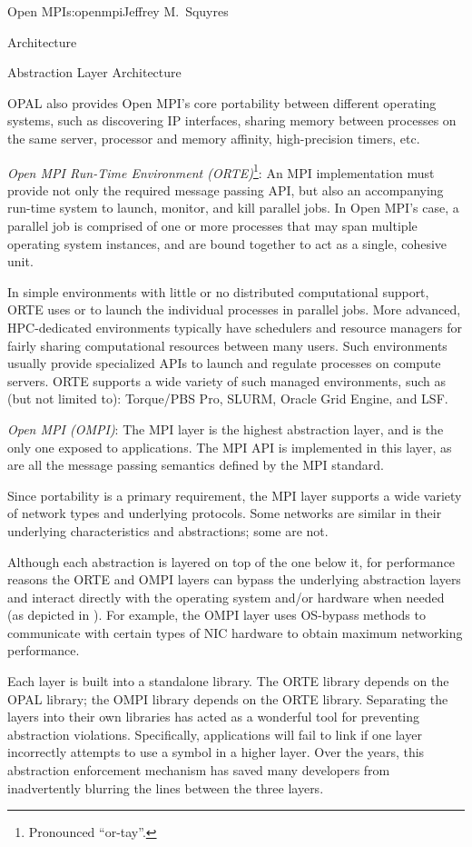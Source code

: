 \begin{aosachapter}{Open MPI}{s:openmpi}{Jeffrey M.\ Squyres}
\begin{aosasect1}{Architecture}
\begin{aosasect2}{Abstraction Layer Architecture}
\begin{aosaitemize}
  OPAL also provides Open MPI's core portability between different
  operating systems, such as discovering IP interfaces, sharing
  memory between processes on the same server, processor and memory
  affinity, high-precision timers, etc.

\item \emph{Open MPI Run-Time Environment (ORTE)}\footnote{Pronounced
    ``or-tay''.}: An MPI implementation must provide not only the
  required message passing API, but also an accompanying run-time
  system to launch, monitor, and kill parallel jobs.  In Open MPI's
  case, a parallel job is comprised of one or more processes that may
  span multiple operating system instances, and are bound together to
  act as a single, cohesive unit.

  In simple environments with little or no distributed computational
  support, ORTE uses  or  to launch the individual
  processes in parallel jobs.  More advanced, HPC-dedicated
  environments typically have schedulers and resource managers for
  fairly sharing computational resources between many users.  Such
  environments usually provide specialized APIs to launch and regulate
  processes on compute servers.  ORTE supports a wide variety of such
  managed environments, such as (but not limited to): Torque/PBS
  Pro, SLURM, Oracle Grid Engine, and LSF.

\item \emph{Open MPI (OMPI)}: The MPI layer is the highest abstraction layer,
  and is the only one exposed to applications.  The MPI API is
  implemented in this layer, as are all the message passing semantics
  defined by the MPI standard.

  Since portability is a primary requirement, the MPI layer supports a
  wide variety of network types and underlying protocols.  Some
  networks are similar in their underlying characteristics and
  abstractions; some are not.
\end{aosaitemize}

Although each abstraction is layered on top of the one below it, for
performance reasons the ORTE and OMPI layers can bypass the
underlying abstraction layers and interact directly with the operating
system and/or hardware when needed (as depicted in
).  For example, the OMPI layer uses
OS-bypass methods to communicate with certain types of NIC hardware to
obtain maximum networking performance.

Each layer is built into a standalone library.  The ORTE library
depends on the OPAL library; the OMPI library depends on the ORTE
library.
%
Separating the layers into their own libraries has acted as a
wonderful tool for preventing abstraction violations.
%
Specifically, applications will fail to link if one layer incorrectly
attempts to use a symbol in a higher layer.
%
Over the years, this abstraction enforcement mechanism has saved many
developers from inadvertently blurring the lines between the three
layers.


\end{aosasect2}
\end{aosasect1}
\end{aosachapter}
